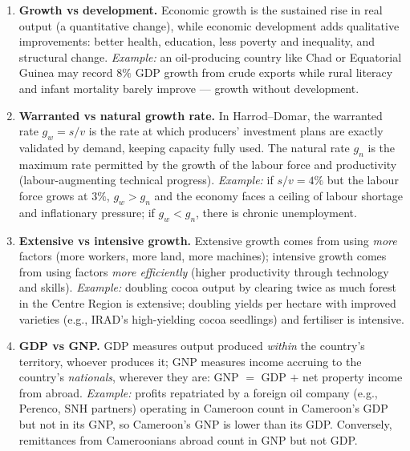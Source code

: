 \documentclass[11pt]{article}
\begin{document}
\begin{corrige}
\begin{enumerate}
\item \textbf{Growth vs development.} Economic growth is the sustained rise in real output (a quantitative change), while economic development adds qualitative improvements: better health, education, less poverty and inequality, and structural change. \emph{Example:} an oil-producing country like Chad or Equatorial Guinea may record $8\%$ GDP growth from crude exports while rural literacy and infant mortality barely improve — growth without development.
\item \textbf{Warranted vs natural growth rate.} In Harrod--Domar, the warranted rate $g_w = s/v$ is the rate at which producers' investment plans are exactly validated by demand, keeping capacity fully used. The natural rate $g_n$ is the maximum rate permitted by the growth of the labour force and productivity (labour-augmenting technical progress). \emph{Example:} if $s/v = 4\%$ but the labour force grows at $3\%$, $g_w > g_n$ and the economy faces a ceiling of labour shortage and inflationary pressure; if $g_w < g_n$, there is chronic unemployment.
\item \textbf{Extensive vs intensive growth.} Extensive growth comes from using \emph{more} factors (more workers, more land, more machines); intensive growth comes from using factors \emph{more efficiently} (higher productivity through technology and skills). \emph{Example:} doubling cocoa output by clearing twice as much forest in the Centre Region is extensive; doubling yields per hectare with improved varieties (e.g., IRAD's high-yielding cocoa seedlings) and fertiliser is intensive.
\item \textbf{GDP vs GNP.} GDP measures output produced \emph{within} the country's territory, whoever produces it; GNP measures income accruing to the country's \emph{nationals}, wherever they are: GNP $=$ GDP $+$ net property income from abroad. \emph{Example:} profits repatriated by a foreign oil company (e.g., Perenco, SNH partners) operating in Cameroon count in Cameroon's GDP but not in its GNP, so Cameroon's GNP is lower than its GDP. Conversely, remittances from Cameroonians abroad count in GNP but not GDP.
\end{enumerate}
\end{corrige}
\end{document}
